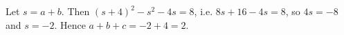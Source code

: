 Let $s=a+b$. Then $(s+4)^2-s^2-4s=8$, i.e. $8s+16-4s=8$, so $4s=-8$ and $s=-2$. Hence $a+b+c=-2+4=\boxed{2}$.
